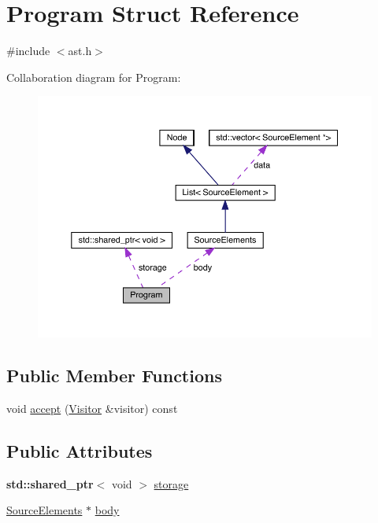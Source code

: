 \hypertarget{struct_program}{}\section{Program Struct Reference}
\label{struct_program}


{\ttfamily \#include $<$ast.\+h$>$}



Collaboration diagram for Program\+:\nopagebreak
\begin{figure}[H]
\begin{center}
\leavevmode
\includegraphics[width=350pt]{struct_program__coll__graph}
\end{center}
\end{figure}
\subsection*{Public Member Functions}
\begin{DoxyCompactItemize}
\item 
void \hyperlink{struct_program_afbd3eb6a94760e56c25492ea1dc685ed}{accept} (\hyperlink{struct_visitor}{Visitor} \&visitor) const
\end{DoxyCompactItemize}
\subsection*{Public Attributes}
\begin{DoxyCompactItemize}
\item 
\textbf{ std\+::shared\+\_\+ptr}$<$ void $>$ \hyperlink{struct_program_aa25d5746067ab06823bf867e89dc8785}{storage}
\item 
\hyperlink{struct_source_elements}{Source\+Elements} $\ast$ \hyperlink{struct_program_a5a4db26ab169d8e65def12c02f5af6e5}{body}
\end{DoxyCompactItemize}


